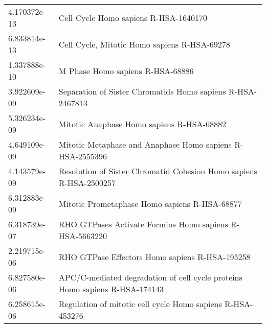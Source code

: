 \begin{longtable}{p{2.4cm}p{14.5cm}}
\bottomrule
\endlastfoot
             4.170372e-13 &                                                                                                                  Cell Cycle Homo sapiens R-HSA-1640170 \\
             6.833814e-13 &                                                                                                           Cell Cycle, Mitotic Homo sapiens R-HSA-69278 \\
             1.337888e-10 &                                                                                                                       M Phase Homo sapiens R-HSA-68886 \\
             3.922609e-09 &                                                                                             Separation of Sister Chromatids Homo sapiens R-HSA-2467813 \\
             5.326234e-09 &                                                                                                              Mitotic Anaphase Homo sapiens R-HSA-68882 \\
             4.649109e-09 &                                                                                              Mitotic Metaphase and Anaphase Homo sapiens R-HSA-2555396 \\
             4.143579e-09 &                                                                                     Resolution of Sister Chromatid Cohesion Homo sapiens R-HSA-2500257 \\
             6.312883e-09 &                                                                                                          Mitotic Prometaphase Homo sapiens R-HSA-68877 \\
             6.318739e-07 &                                                                                                RHO GTPases Activate Formins Homo sapiens R-HSA-5663220 \\
             2.219715e-06 &                                                                                                         RHO GTPase Effectors Homo sapiens R-HSA-195258 \\
             6.827580e-06 &                                                                            APC/C-mediated degradation of cell cycle proteins Homo sapiens R-HSA-174143 \\
             6.258615e-06 &                                                                                             Regulation of mitotic cell cycle Homo sapiens R-HSA-453276 \\

\end{longtable}
